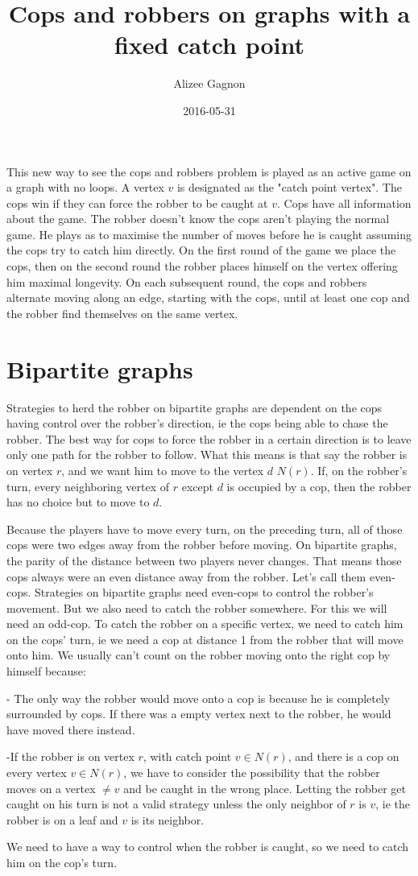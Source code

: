 \documentclass{article}
\title{Cops and robbers on graphs with a fixed catch point}
\date{2016-05-31}
\author{Alizee Gagnon}
\begin{document}
    \maketitle
    
    This new way to see the cops and robbers problem is played as an active game on a graph with no loops. A vertex $v$ is designated as the "catch point vertex". The cops win if they can force the robber to be caught at $v$. Cops have all information about the game. The robber doesn't know the cops aren't playing the normal game. He plays as to maximise the number of moves before he is caught assuming the cops try to catch him directly. On the first round of the game we place the cops, then on the second round the robber places himself on the vertex offering him maximal longevity. On each subsequent round, the cops and robbers alternate moving along an edge, starting with the cops, until at least one cop and the robber find themselves on the same vertex.
    
\section{Bipartite graphs}
    Strategies to herd the robber on bipartite graphs are dependent on the cops having control over the robber's direction, ie the cops being able to chase the robber. The best way for cops to force the robber in a certain direction is to leave only one path for the robber to follow. What this means is that say the robber is on vertex $r$, and we want him to move to the vertex $d$  $N(r)$. If, on the robber's turn, every neighboring vertex of $r$ except $d$ is occupied by a cop, then the robber has no choice but to move to $d$.
    
    Because the players have to move every turn, on the preceding turn, all of those cops were two edges away from the robber before moving. On bipartite graphs, the parity of the distance between two players never changes. That means those cops always were an even distance away from the robber. Let's call them even-cops. Strategies on bipartite graphs need even-cops to control the robber's movement. But we also need to catch the robber somewhere. For this we will need an odd-cop. To catch the robber on a specific vertex, we need to catch him on the cops' turn, ie we need a cop at distance 1 from the robber that will move onto him. We usually can't count on the robber moving onto the right cop by himself because:
    
    - The only way the robber would move onto a cop is because he is completely surrounded by cops. If there was a empty vertex next to the robber, he would have moved there instead. 
    
    -If the robber is on vertex $r$, with catch point $v \in N(r)$, and there is a cop on every vertex $ v \in N(r)$, we have to consider the possibility that the robber moves on a vertex $\ne v$ and be caught in the wrong place. Letting the robber get caught on his turn is not a valid strategy unless the only neighbor of $r$ is $v$, ie the robber is on a leaf and $v$ is its neighbor.
    
    We need to have a way to control when the robber is caught, so we need to catch him on the cop's turn. 
   
\end{document}
